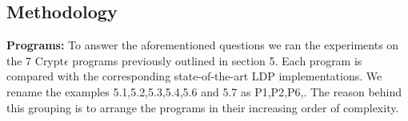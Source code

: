 \subsection{Methodology} 
\textbf{Programs:}
To answer the aforementioned questions we ran the experiments on the 7 Crypt$\epsilon$ programs previously outlined in section 5. Each program is compared with the corresponding state-of-the-art \textsf{LDP} implementations. We rename the examples 5.1,5.2,5.3,5.4,5.6 and 5.7 as P1,P2,P6,. The reason behind this grouping is to arrange the programs in their increasing order of complexity.  %

